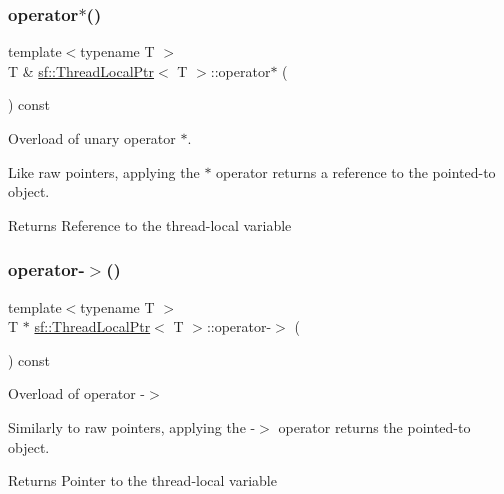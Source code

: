 \subsubsection{\texorpdfstring{operator$\ast$()}{operator*()}}
{\footnotesize\ttfamily template$<$typename T $>$ \\
T \& \hyperlink{classsf_1_1_thread_local_ptr}{sf\+::\+Thread\+Local\+Ptr}$<$ T $>$\+::operator$\ast$ (\begin{DoxyParamCaption}{ }\end{DoxyParamCaption}) const}



Overload of unary operator $\ast$. 

Like raw pointers, applying the $\ast$ operator returns a reference to the pointed-\/to object.

\begin{DoxyReturn}{Returns}
Reference to the thread-\/local variable 
\end{DoxyReturn}
\mbox{\label{classsf_1_1_thread_local_ptr_a25646e1014a933d1a45b9ce17bab7703}} 
\subsubsection{\texorpdfstring{operator-\/$>$()}{operator->()}}
{\footnotesize\ttfamily template$<$typename T $>$ \\
T $\ast$ \hyperlink{classsf_1_1_thread_local_ptr}{sf\+::\+Thread\+Local\+Ptr}$<$ T $>$\+::operator-\/$>$ (\begin{DoxyParamCaption}{ }\end{DoxyParamCaption}) const}



Overload of operator -\/$>$ 

Similarly to raw pointers, applying the -\/$>$ operator returns the pointed-\/to object.

\begin{DoxyReturn}{Returns}
Pointer to the thread-\/local variable 
\end{DoxyReturn}
\mbox{\label{classsf_1_1_thread_local_ptr_a14dcf1cdf5f6b3bcdd633014b2b671f5}} 
